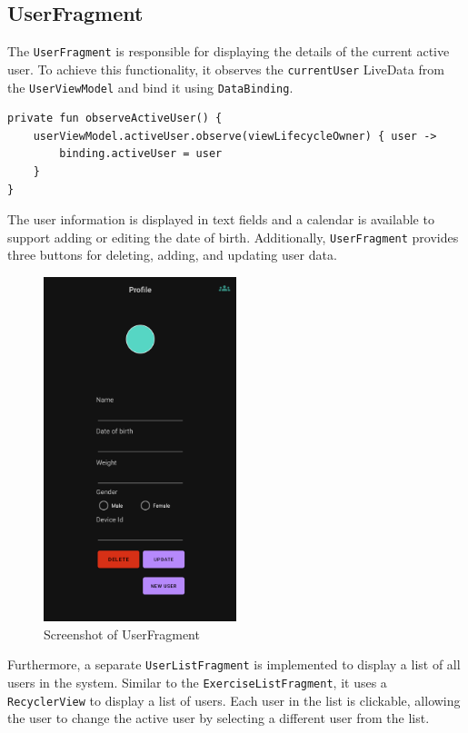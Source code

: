 \subsection{UserFragment}
The \texttt{UserFragment} is responsible for displaying the details of the current active user. 
To achieve this functionality, it observes the \texttt{currentUser} LiveData from the \texttt{UserViewModel} and bind it using \texttt{DataBinding}. 
\begin{lstlisting}[caption={Observer for currentUser (UserFragment)}]
private fun observeActiveUser() {
    userViewModel.activeUser.observe(viewLifecycleOwner) { user ->
        binding.activeUser = user
    }
}
\end{lstlisting}
The user information is displayed in text fields and a calendar is available to support adding or editing the date of birth. 
Additionally, \texttt{UserFragment} provides three buttons for deleting, adding, and updating user data.
\begin{figure}[H]
    \centering
    \includegraphics[width=0.5\textwidth]{images/userfragment-screenshot.png}
    \caption{Screenshot of UserFragment}
    \label{fig:userfragment_screenshot}
\end{figure}

Furthermore, a separate \texttt{UserListFragment} is implemented to display a list of all users in the system. 
Similar to the \texttt{ExerciseListFragment}, it uses a \texttt{RecyclerView} to display a list of users. 
Each user in the list is clickable, allowing the user to change the active user by selecting a different user from the list.


